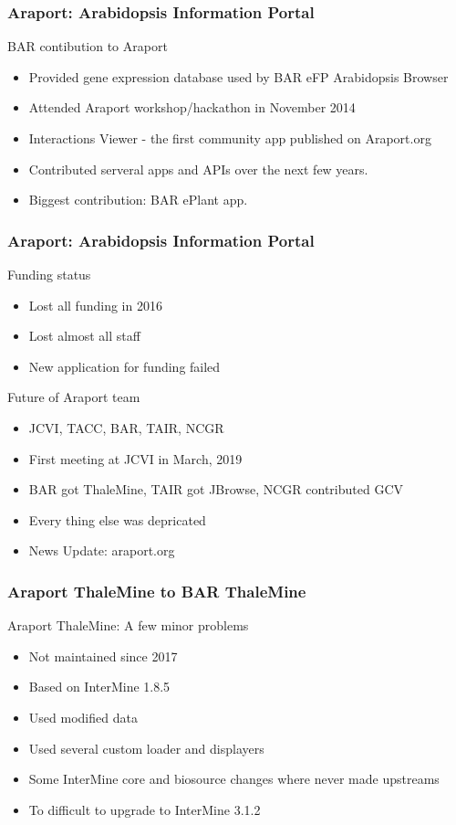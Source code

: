 \documentclass{beamer}
\begin{document}
\begin{frame}
    \frametitle{Araport: Arabidopsis Information Portal}
    BAR contibution to Araport
    \begin{itemize}
        \item Provided gene expression database used by BAR eFP Arabidopsis Browser
        \item Attended Araport workshop/hackathon in November 2014
        \item Interactions Viewer - the first community app published on Araport.org
        \item Contributed serveral apps and APIs over the next few years.
        \item Biggest contribution: BAR ePlant app.
    \end{itemize}
\end{frame}

\begin{frame}
    \frametitle{Araport: Arabidopsis Information Portal}
    Funding status
    \begin{itemize}
        \item Lost all funding in 2016
        \item Lost almost all staff 
        \item New application for funding failed
    \end{itemize}
    Future of Araport team
    \begin{itemize}
        \item JCVI, TACC, BAR, TAIR, NCGR
        \item First meeting at JCVI in March, 2019
        \item BAR got ThaleMine, TAIR got JBrowse, NCGR contributed GCV
        \item Every thing else was depricated
        \item News Update: araport.org
    \end{itemize}
\end{frame}

\begin{frame}
    \frametitle{Araport ThaleMine to BAR ThaleMine}
    Araport ThaleMine: A few minor problems
    \begin{itemize}
        \item Not maintained since 2017
        \item Based on InterMine 1.8.5
        \item Used modified data
        \item Used several custom loader and displayers
        \item Some InterMine core and biosource changes where never made upstreams
        \item To difficult to upgrade to InterMine 3.1.2
    \end{itemize}
\end{frame}
\end{document}
